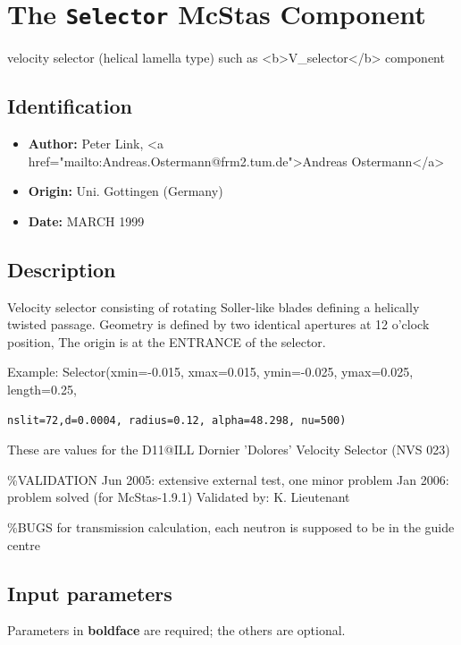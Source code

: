 \section{The \texttt{Selector} McStas Component}
velocity selector (helical lamella type) such as \textless{}b\textgreater{}V\_selector\textless{}/b\textgreater{} component

\subsection*{Identification}
\begin{itemize}
  \item \textbf{Author:} Peter Link, \textless{}a href="mailto:Andreas.Ostermann@frm2.tum.de"\textgreater{}Andreas Ostermann\textless{}/a\textgreater{}
  \item \textbf{Origin:} Uni. Gottingen (Germany)
  \item \textbf{Date:} MARCH 1999
\end{itemize}

\subsection*{Description}
Velocity selector consisting of rotating Soller-like blades defining a helically twisted passage. Geometry is defined by two identical apertures at 12 o'clock position, The origin is at the ENTRANCE of the selector.

Example: Selector(xmin=-0.015, xmax=0.015, ymin=-0.025, ymax=0.025, length=0.25,

\begin{verbatim}
nslit=72,d=0.0004, radius=0.12, alpha=48.298, nu=500)
\end{verbatim}

These are values for the D11@ILL Dornier 'Dolores' Velocity Selector (NVS 023)

\%VALIDATION Jun 2005: extensive external test, one minor problem Jan 2006: problem solved (for McStas-1.9.1) Validated by: K. Lieutenant

\%BUGS for transmission calculation, each neutron is supposed to be in the guide centre

\subsection*{Input parameters}
Parameters in \textbf{boldface} are required; the others are optional.

